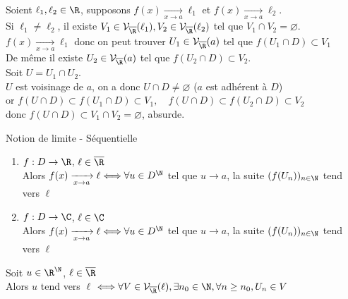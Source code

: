 \documentclass[12pt,a4paper]{report}
\begin{document}
\begin{demo}
Soient $\ell_1, \ell_2 \in \R$, supposons $f(x) \xrightarrow[x \rightarrow a]{} \ell_1$ et $f(x) \xrightarrow[x \rightarrow a]{} \ell_2$. \\
Si $\ell_1 \neq \ell_2$, il existe $V_1 \in \mathcal{V}_{\overline{\R}}(\ell_1), V_2 \in \mathcal{V}_{\overline{\R}}(\ell_2)$ tel que $V_1 \cap V_2 = \varnothing$. \\
$f(x) \xrightarrow[x \rightarrow a]{} \ell_1$ donc on peut trouver $U_1 \in \mathcal{V}_{\overline{\R}}(a)$ tel que $f(U_1 \cap D) \subset V_1$ \\
De même il existe $U_2 \in \mathcal{V}_{\overline{\R}}(a)$ tel que $f(U_2 \cap D) \subset V_2$. \\
Soit $U = U_1 \cap U_2$. \\
$U$ est voisinage de $a$, on a donc $U \cap D \neq \varnothing$ ($a$ est adhérent à $D$) \\
or $f(U \cap D) \subset f(U_1 \cap D) \subset V_1, \quad f(U \cap D) \subset f(U_2 \cap D) \subset V_2$ \\
donc $f(U \cap D) \subset V_1 \cap V_2 = \varnothing$, absurde.

\end{demo}

\begin{definition}{Notion de limite - Séquentielle}{}
\begin{enumerate}
    \item $f:D \rightarrow \R$, $\ell \in \overline{\R}$\\
    Alors $f(x) \xrightarrow[x \rightarrow a]{} \ell \Longleftrightarrow \forall u \in D^\N$ tel que $u \rightarrow a$, la suite $(f(U_n))_{n \in \N}$ tend vers $\ell$
    \item $f:D \rightarrow \C$, $\ell \in \C$\\
    Alors $f(x) \xrightarrow[x \rightarrow a]{} \ell \Longleftrightarrow \forall u \in D^\N$ tel que $u \rightarrow a$, la suite $(f(U_n))_{n \in \N}$ tend vers $\ell$
\end{enumerate}
\end{definition}

\begin{lemme}{}{}
Soit $u \in \R^\N$, $\ell\in \overline{\R}$\\
Alors $u$ tend vers $\ell$ $\Longleftrightarrow \forall V \in \mathcal{V}_{\overline{\R}} (\ell), \exists n_0 \in \N, \forall n \geq n_0, U_n \in V$
\end{lemme}
\end{document}
